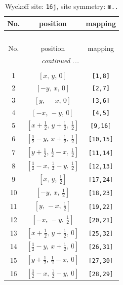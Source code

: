 \documentclass[fleqn,8pt]{jsarticle}
\begin{document}
\renewcommand{\arraystretch}{1.2}
\begin{longtable}{ccc}
\caption{Wyckoff site: {\tt 16j}, site symmetry: {\tt m..}}
 \\
 \hline \hline
No. & position & mapping \\ \hline \endfirsthead

\multicolumn{2}{l}{\tablename\ \thetable{}} \\
 \hline \hline
No. & position & mapping \\ \hline \endhead

 \hline \hline
\multicolumn{2}{r}{\footnotesize\it continued ...} \\ \endfoot

 \hline \hline
\multicolumn{2}{r}{} \\ \endlastfoot

1 & $\left[ x,\, y,\, 0 \right]$ & {\tt [1,8]} \\ \hline
2 & $\left[ - y,\, x,\, 0 \right]$ & {\tt [2,7]} \\ \hline
3 & $\left[ y,\, - x,\, 0 \right]$ & {\tt [3,6]} \\ \hline
4 & $\left[ - x,\, - y,\, 0 \right]$ & {\tt [4,5]} \\ \hline
5 & $\left[ x + \frac{1}{2},\, y + \frac{1}{2},\, \frac{1}{2} \right]$ & {\tt [9,16]} \\ \hline
6 & $\left[ \frac{1}{2} - y,\, x + \frac{1}{2},\, \frac{1}{2} \right]$ & {\tt [10,15]} \\ \hline
7 & $\left[ y + \frac{1}{2},\, \frac{1}{2} - x,\, \frac{1}{2} \right]$ & {\tt [11,14]} \\ \hline
8 & $\left[ \frac{1}{2} - x,\, \frac{1}{2} - y,\, \frac{1}{2} \right]$ & {\tt [12,13]} \\ \hline
9 & $\left[ x,\, y,\, \frac{1}{2} \right]$ & {\tt [17,24]} \\ \hline
10 & $\left[ - y,\, x,\, \frac{1}{2} \right]$ & {\tt [18,23]} \\ \hline
11 & $\left[ y,\, - x,\, \frac{1}{2} \right]$ & {\tt [19,22]} \\ \hline
12 & $\left[ - x,\, - y,\, \frac{1}{2} \right]$ & {\tt [20,21]} \\ \hline
13 & $\left[ x + \frac{1}{2},\, y + \frac{1}{2},\, 0 \right]$ & {\tt [25,32]} \\ \hline
14 & $\left[ \frac{1}{2} - y,\, x + \frac{1}{2},\, 0 \right]$ & {\tt [26,31]} \\ \hline
15 & $\left[ y + \frac{1}{2},\, \frac{1}{2} - x,\, 0 \right]$ & {\tt [27,30]} \\ \hline
16 & $\left[ \frac{1}{2} - x,\, \frac{1}{2} - y,\, 0 \right]$ & {\tt [28,29]} \\
\end{longtable}
\end{document}
